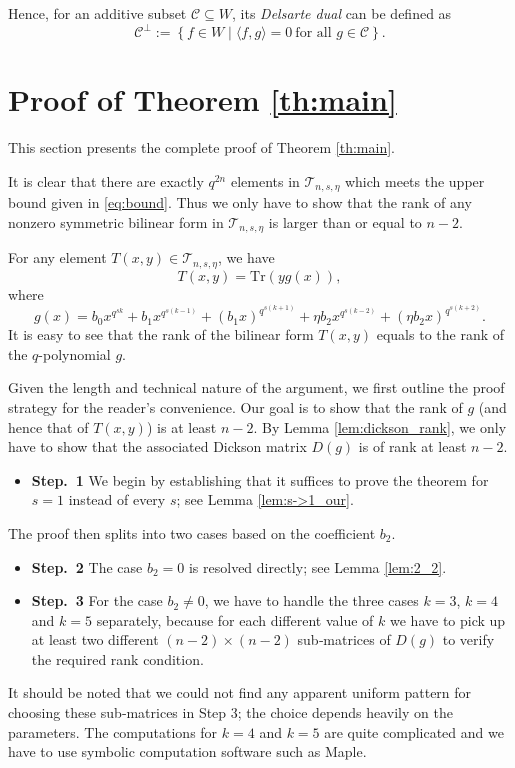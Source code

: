 \documentclass{amsart}
\theoremstyle{plain}
\theoremstyle{definition}
\newcommand{\Tr}{ \ensuremath{ \mathrm{Tr}}}
\newcommand{\cT}{\mathcal{T}}
\begin{document}
		Hence, for an additive subset $\mathcal{C} \subseteq W$, its \emph{Delsarte dual} can be  defined as
		\begin{equation}\label{eq:dual}
			\mathcal{C}^{\perp} := \left\{ f \in W \mid \langle f, g \rangle = 0 \ \text{for all } g \in \mathcal{C} \right\}.
		\end{equation}
	
	\section{Proof of Theorem \ref{th:main}}\label{sec:proof_main}
	
	This section presents the complete proof of Theorem \ref{th:main}.
	
	It is clear that there are exactly $q^{2n}$ elements in $\cT_{n,s,\eta}$ which meets the upper bound given in \eqref{eq:bound}. Thus we only have to show that the rank of any nonzero symmetric bilinear form in $\cT_{n,s,\eta}$ is larger than or equal to $n-2$.
	
	For any element $T(x,y) \in \cT_{n,s,\eta}$, we have
	$$T(x,y)=\Tr(yg(x)),$$
	where 
	\begin{equation}\label{eq:g}
		g(x)=b_0x^{q^{sk}}+b_1x^{q^{s(k-1)}}+(b_1x)^{q^{s(k+1)}}+\eta b_2x^{q^{s(k-2)}}+(\eta b_2x)^{q^{s(k+2)}}.
	\end{equation}
	It is easy to see that the rank of the bilinear form $T(x,y)$ equals to the rank of the $q$-polynomial $g$. 
	

		Given the length and technical nature of the argument, we first outline the proof strategy for the reader's convenience. Our goal is to show that the rank of $g$ (and hence that of $T(x,y)$) is at least $n-2$. By Lemma \ref{lem:dickson_rank}, we only have to show that the associated Dickson matrix $D(g)$ is of rank at least $n-2$.
		\begin{itemize}
			\item\textbf{Step.\ 1}  We begin by establishing that it suffices to prove the theorem for \( s = 1 \) instead of every $s$; see Lemma \ref{lem:s->1_our}. 
		\end{itemize}
		The proof then splits into two cases based on the coefficient \( b_2 \).
		\begin{itemize}
			\item \textbf{Step.\ 2}  The case \( b_2 = 0 \) is resolved directly; see Lemma \ref{lem:2_2}.
		\end{itemize}
		\begin{itemize}
			\item \textbf{Step.\ 3} For the case $ b_2 \neq 0$, we have to handle the three cases \(k=3\), \(k=4\) and \(k=5\) separately, because for each  different value of $k$ we have to pick up at least two different \((n-2)\times(n-2)\) sub‑matrices of $D(g)$ to verify the required rank condition.
		\end{itemize}
		It should be noted that we could not find any apparent uniform pattern for choosing these sub‑matrices in Step 3; the choice depends heavily on the parameters. The computations for \(k=4\) and \(k=5\) are quite complicated and we have  to use symbolic computation software such as Maple.
		
\end{document}
